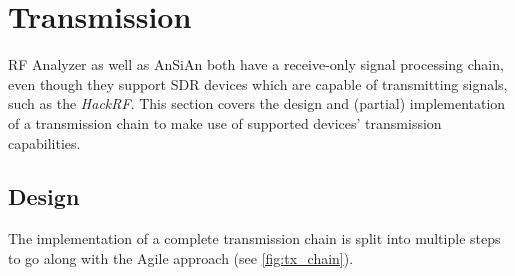 \section{Transmission\label{sec:transmission}}

RF Analyzer as well as \ac{AnSiAn} both have a receive-only signal processing chain, even though they support \ac{SDR} devices which are capable of transmitting signals, such as the \emph{HackRF}. This section covers the design and (partial) implementation of a transmission chain to make use of supported devices' transmission capabilities.


\subsection{Design}

The implementation of a complete transmission chain is split into multiple steps
to go along with the Agile approach (see \autoref{fig:tx_chain}).

